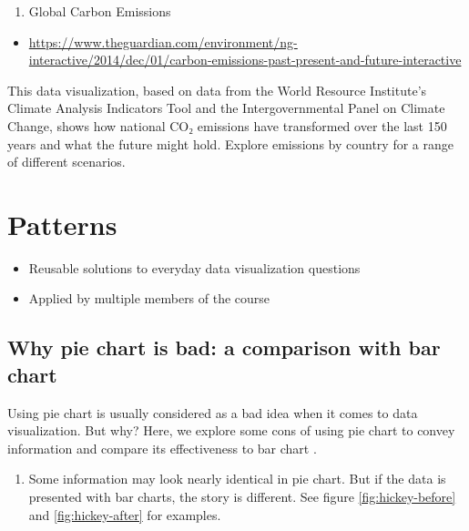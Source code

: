 \documentclass[]{book}
\providecommand{\tightlist}{%
  \setlength{\itemsep}{0pt}\setlength{\parskip}{0pt}}
\theoremstyle{definition}
\theoremstyle{definition}
\theoremstyle{definition}
\theoremstyle{remark}
\begin{document}
\begin{enumerate}
\def\labelenumi{\arabic{enumi}.}
\setcounter{enumi}{14}
\tightlist
\item
  Global Carbon Emissions
\end{enumerate}

\begin{itemize}
\tightlist
\item
  \url{https://www.theguardian.com/environment/ng-interactive/2014/dec/01/carbon-emissions-past-present-and-future-interactive}
\end{itemize}

This data visualization, based on data from the World Resource
Institute's Climate Analysis Indicators Tool and the Intergovernmental
Panel on Climate Change, shows how national CO₂ emissions have
transformed over the last 150 years and what the future might hold.
Explore emissions by country for a range of different scenarios.

\chapter{Patterns}\label{patterns}

\begin{itemize}
\tightlist
\item
  Reusable solutions to everyday data visualization questions
\item
  Applied by multiple members of the course
\end{itemize}

\section{Why pie chart is bad: a comparison with bar
chart}\label{why-pie-chart-is-bad-a-comparison-with-bar-chart}

Using pie chart is usually considered as a bad idea when it comes to
data visualization. But why? Here, we explore some cons of using pie
chart to convey information and compare its effectiveness to bar chart
\citep{hickey-pie-worst} \citep{henry-defense-pie} \citep{quach-penny}.

\begin{enumerate}
\def\labelenumi{\arabic{enumi}.}
\tightlist
\item
  Some information may look nearly identical in pie chart. But if the
  data is presented with bar charts, the story is different. See figure
  \ref{fig:hickey-before} and \ref{fig:hickey-after} for examples.
\end{enumerate}
\end{document}
